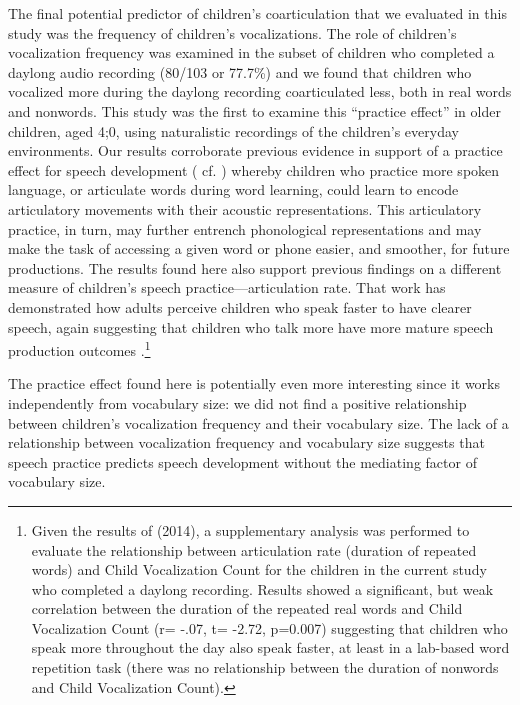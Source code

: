 \documentclass[a4paper,man,natbib,donotrepeattitle, apacite]{apa6}
\begin{document}
The final potential predictor of children’s coarticulation that we evaluated in this study was the frequency of children’s vocalizations. The role of children's vocalization frequency was examined in the subset of children who completed a daylong audio recording (80/103 or 77.7\%) and we found that children who vocalized more during the daylong recording coarticulated less, both in real words and nonwords. This study was the first to examine this ``practice effect'' in older children, aged 4;0, using naturalistic recordings of the children’s everyday environments. Our results corroborate previous evidence in support of a practice effect for speech development ( cf. ) whereby children who practice more spoken language, or articulate words during word learning, could learn to encode articulatory movements with their acoustic representations. This articulatory practice, in turn, may further entrench phonological representations and may make the task of accessing a given word or phone easier, and smoother, for future productions. The results found here also support previous findings on a different measure of children's speech practice---articulation rate. That work has demonstrated how adults perceive children who speak faster to have clearer speech, again suggesting that children who talk more have more mature speech production outcomes \cite{redford2014}.\footnote{Given the results of \citeauthor{redford2014} (2014), a supplementary analysis was performed to evaluate the relationship between articulation rate (duration of repeated words) and Child Vocalization Count for the children in the current study who completed a daylong recording. Results showed a significant, but weak correlation between the duration of the repeated real words and Child Vocalization Count (r= -.07, t= -2.72, p=0.007) suggesting that children who speak more throughout the day also speak faster, at least in a lab-based word repetition task (there was no relationship between the duration of nonwords and Child Vocalization Count).} 

The practice effect found here is potentially even more interesting since it works independently from vocabulary size: we did not find a positive relationship between children's vocalization frequency and their vocabulary size. The lack of a relationship between vocalization frequency and vocabulary size suggests  that speech practice predicts speech development without the mediating factor of vocabulary size. 
\end{document}
